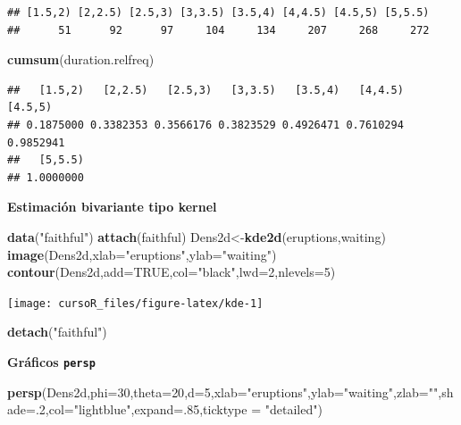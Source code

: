 \documentclass[]{book}
\newenvironment{Shaded}{\begin{snugshade}}{\end{snugshade}}
\newcommand{\KeywordTok}[1]{\textcolor[rgb]{0.13,0.29,0.53}{\textbf{#1}}}
\newcommand{\DataTypeTok}[1]{\textcolor[rgb]{0.13,0.29,0.53}{#1}}
\newcommand{\DecValTok}[1]{\textcolor[rgb]{0.00,0.00,0.81}{#1}}
\newcommand{\StringTok}[1]{\textcolor[rgb]{0.31,0.60,0.02}{#1}}
\newcommand{\OtherTok}[1]{\textcolor[rgb]{0.56,0.35,0.01}{#1}}
\newcommand{\NormalTok}[1]{#1}
\begin{document}
\begin{verbatim}
## [1.5,2) [2,2.5) [2.5,3) [3,3.5) [3.5,4) [4,4.5) [4.5,5) [5,5.5) 
##      51      92      97     104     134     207     268     272
\end{verbatim}

\begin{Shaded}
\begin{Highlighting}[]
\KeywordTok{cumsum}\NormalTok{(duration.relfreq)}
\end{Highlighting}
\end{Shaded}

\begin{verbatim}
##   [1.5,2)   [2,2.5)   [2.5,3)   [3,3.5)   [3.5,4)   [4,4.5)   [4.5,5) 
## 0.1875000 0.3382353 0.3566176 0.3823529 0.4926471 0.7610294 0.9852941 
##   [5,5.5) 
## 1.0000000
\end{verbatim}

\textbf{Estimación bivariante tipo kernel}

\begin{Shaded}
\begin{Highlighting}[]
\KeywordTok{data}\NormalTok{(}\StringTok{"faithful"}\NormalTok{)}
\KeywordTok{attach}\NormalTok{(faithful)}
\NormalTok{Dens2d<-}\KeywordTok{kde2d}\NormalTok{(eruptions,waiting)}
\KeywordTok{image}\NormalTok{(Dens2d,}\DataTypeTok{xlab=}\StringTok{"eruptions"}\NormalTok{,}\DataTypeTok{ylab=}\StringTok{"waiting"}\NormalTok{)}
\KeywordTok{contour}\NormalTok{(Dens2d,}\DataTypeTok{add=}\OtherTok{TRUE}\NormalTok{,}\DataTypeTok{col=}\StringTok{"black"}\NormalTok{,}\DataTypeTok{lwd=}\DecValTok{2}\NormalTok{,}\DataTypeTok{nlevels=}\DecValTok{5}\NormalTok{)}
\end{Highlighting}
\end{Shaded}

\begin{center}\texttt{[image: cursoR\_files/figure-latex/kde-1]} \end{center}

\begin{Shaded}
\begin{Highlighting}[]
\KeywordTok{detach}\NormalTok{(}\StringTok{"faithful"}\NormalTok{)}
\end{Highlighting}
\end{Shaded}

\textbf{Gráficos \texttt{persp}}

\begin{Shaded}
\begin{Highlighting}[]
\KeywordTok{persp}\NormalTok{(Dens2d,}\DataTypeTok{phi=}\DecValTok{30}\NormalTok{,}\DataTypeTok{theta=}\DecValTok{20}\NormalTok{,}\DataTypeTok{d=}\DecValTok{5}\NormalTok{,}\DataTypeTok{xlab=}\StringTok{"eruptions"}\NormalTok{,}\DataTypeTok{ylab=}\StringTok{"waiting"}\NormalTok{,}\DataTypeTok{zlab=}\StringTok{""}\NormalTok{,}\DataTypeTok{shade=}\NormalTok{.}\DecValTok{2}\NormalTok{,}\DataTypeTok{col=}\StringTok{"lightblue"}\NormalTok{,}\DataTypeTok{expand=}\NormalTok{.}\DecValTok{85}\NormalTok{,}\DataTypeTok{ticktype =} \StringTok{"detailed"}\NormalTok{)}
\end{Highlighting}
\end{Shaded}
\end{document}
